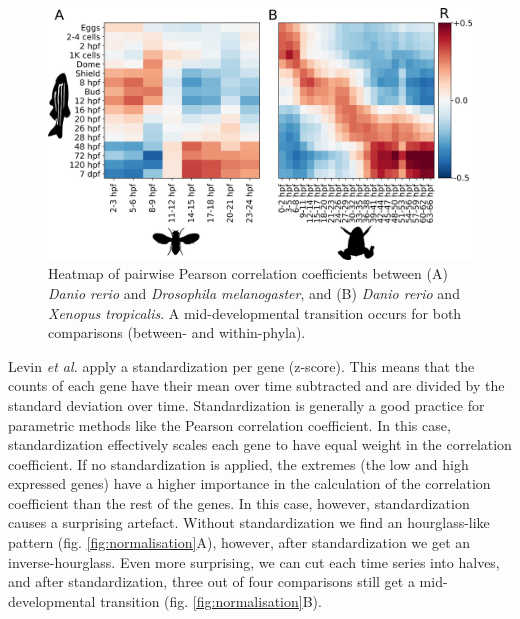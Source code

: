 \begin{figure}[H]
    \includegraphics[width=\linewidth]{ch4.hourglass/images/within_between_phyla.png}
    \caption{Heatmap of pairwise Pearson correlation coefficients between (A) \textit{Danio rerio} and \textit{Drosophila melanogaster}, and (B) \textit{Danio rerio} and \textit{Xenopus tropicalis}. A mid-developmental transition occurs for both comparisons (between- and within-phyla).}
    \label{fig:within_phylum}
\end{figure}

Levin \textit{et al.} apply a standardization per gene (z-score). This means that the counts of each gene have their mean over time subtracted and are divided by the standard deviation over time. Standardization is generally a good practice for parametric methods like the Pearson correlation coefficient. In this case, standardization effectively scales each gene to have equal weight in the correlation coefficient. If no standardization is applied, the extremes (the low and high expressed genes) have a higher importance in the calculation of the correlation coefficient than the rest of the genes. In this case, however, standardization causes a surprising artefact. Without standardization we find an hourglass-like pattern (fig. \ref{fig:normalisation}A), however, after standardization we get an inverse-hourglass. Even more surprising, we can cut each time series into halves, and after standardization, three out of four comparisons still get a mid-developmental transition (fig. \ref{fig:normalisation}B). 

